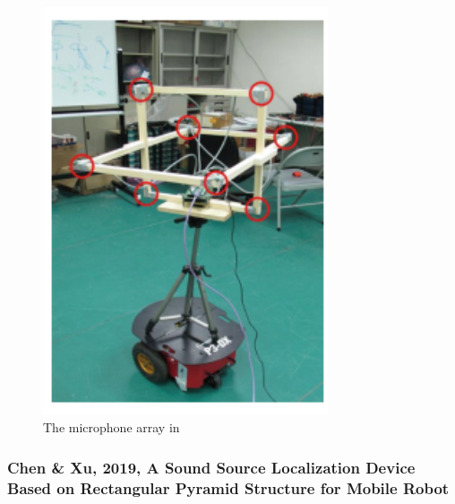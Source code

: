 \documentclass{report}
\begin{document}
\begin{figure}[H]
\includegraphics[width=0.75\textwidth]{./hu_2009/array.png}
\centering
\caption{The microphone array in \cite{hu_estimation_2009}}
\label{fig:hu_2009_plot}
\centering
\end{figure}

\subsubsection{Chen \& Xu, 2019, A Sound Source Localization Device Based on Rectangular Pyramid Structure for Mobile Robot}
\end{document}
